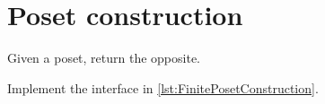 
\section{\usebox{\chaptergear}
  Poset construction}

\begin{codeexercise}
    Given a poset, return the opposite.

    Implement the interface in \cref{lst:FinitePosetConstruction}.
\end{codeexercise}

